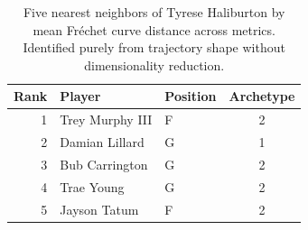 \begin{table}[htbp]
  \centering\small
  \begin{tabular}{rllc}
    \toprule
    Rank & Player & Position & Archetype \\
    \midrule
    1 & Trey Murphy III & F & 2 \\
    2 & Damian Lillard & G & 1 \\
    3 & Bub Carrington & G & 2 \\
    4 & Trae Young & G & 2 \\
    5 & Jayson Tatum & F & 2 \\
    \bottomrule
  \end{tabular}
  \caption{Five nearest neighbors of Tyrese Haliburton by mean Fr\'{e}chet curve distance across metrics. Identified purely from trajectory shape without dimensionality reduction.}
  \label{tab:Tyrese_Haliburton_frechet_curve_neighbors}
\end{table}

